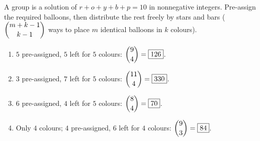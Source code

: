 A group is a solution of $r+o+y+b+p=10$ in nonnegative integers. Pre-assign the required balloons, then distribute the rest freely by stars and bars ($\dbinom{m+k-1}{k-1}$ ways to place $m$ identical balloons in $k$ colours).
\begin{enumerate}
\item[(a)] $5$ pre-assigned, $5$ left for $5$ colours: $\dbinom94=\boxed{126}$.
\item[(b)] $3$ pre-assigned, $7$ left for $5$ colours: $\dbinom{11}4=\boxed{330}$.
\item[(c)] $6$ pre-assigned, $4$ left for $5$ colours: $\dbinom84=\boxed{70}$.
\item[(d)] Only $4$ colours; $4$ pre-assigned, $6$ left for $4$ colours: $\dbinom93=\boxed{84}$.
\end{enumerate}
